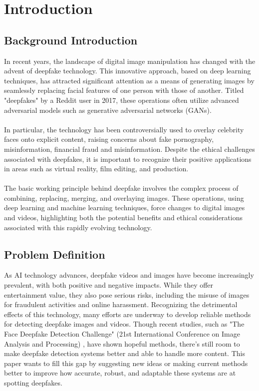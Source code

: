 \chapter{Introduction}
    \section{Background Introduction}
        In recent years, the landscape of digital image manipulation has changed with the advent of deepfake technology.
        This innovative approach, based on deep learning techniques, has attracted significant attention as a means of generating images by seamlessly replacing facial features of one person with those of another.
        Titled "deepfakes" by a Reddit user in 2017, these operations often utilize advanced adversarial models such as generative adversarial networks (GANs). \cite{st2022deep} \\\\
        In particular, the technology has been controversially used to overlay celebrity faces onto explicit content, raising concerns about fake pornography, misinformation, financial fraud and misinformation.
        Despite the ethical challenges associated with deepfakes, it is important to recognize their positive applications in areas such as virtual reality, film editing, and production. \\\\
        The basic working principle behind deepfake involves the complex process of combining, replacing, merging,  and overlaying images.
        These operations, using deep learning and machine learning techniques, force changes to digital images and videos, highlighting both the potential benefits and ethical considerations associated with this rapidly evolving technology.


    \section{Problem Definition}
        As AI technology advances, deepfake videos and images have become increasingly prevalent, with both positive and negative impacts. While they offer entertainment value, they also pose serious risks, including the misuse of images for fraudulent activities and online harassment. Recognizing the detrimental effects of this technology, many efforts are underway to develop reliable methods for detecting deepfake images and videos. Though recent studies, such as "The Face Deepfake Detection Challenge" (21st International Conference on Image Analysis and Processing) \cite{jimaging8100263}, have shown hopeful methods, there's still room to make deepfake detection systems better and able to handle more content. This paper wants to fill this gap by suggesting new ideas or making current methods better to improve how accurate, robust, and adaptable these systems are at spotting deepfakes.

